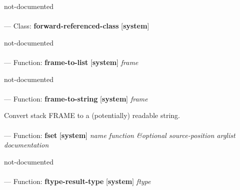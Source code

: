 \begin{adjustwidth}{5em}{5em}
not-documented
\end{adjustwidth}

\paragraph{}
\label{SYSTEM:FORWARD-REFERENCED-CLASS}
--- Class: \textbf{forward-referenced-class} [\textbf{system}] \textit{}

\begin{adjustwidth}{5em}{5em}
not-documented
\end{adjustwidth}

\paragraph{}
\label{SYSTEM:FRAME-TO-LIST}
--- Function: \textbf{frame-to-list} [\textbf{system}] \textit{frame}

\begin{adjustwidth}{5em}{5em}
not-documented
\end{adjustwidth}

\paragraph{}
\label{SYSTEM:FRAME-TO-STRING}
--- Function: \textbf{frame-to-string} [\textbf{system}] \textit{frame}

\begin{adjustwidth}{5em}{5em}
Convert stack FRAME to a (potentially) readable string.
\end{adjustwidth}

\paragraph{}
\label{SYSTEM:FSET}
--- Function: \textbf{fset} [\textbf{system}] \textit{name function \&optional source-position arglist documentation}

\begin{adjustwidth}{5em}{5em}
not-documented
\end{adjustwidth}

\paragraph{}
\label{SYSTEM:FTYPE-RESULT-TYPE}
--- Function: \textbf{ftype-result-type} [\textbf{system}] \textit{ftype}

